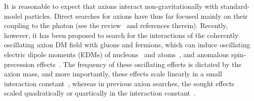 It is reasonable to expect that axions interact non-gravitationally with standard-model particles.
Direct searches for axions have thus far focused mainly on their coupling to the photon (see the review~\cite{Axion-Review2015} and references therein).
Recently, however, it has been proposed to search for the interactions of the coherently oscillating axion DM field with gluons and fermions, which can induce oscillating electric dipole moments (EDMs) of nucleons~\cite{Graham2011} and atoms~\cite{Stadnik2014A,Roberts2014A,Roberts2014B}, and anomalous spin-precession effects~\cite{Flambaum2013Patras,Stadnik2014A,Graham2013}.
The frequency of these oscillating effects is dictated by the axion mass, and more importantly, these effects scale linearly in a small interaction constant~\cite{Graham2011,Stadnik2014A,Roberts2014A,Roberts2014B,Flambaum2013Patras,Graham2013}, whereas in previous axion searches, the sought effects scaled quadratically or quartically in the interaction constant~\cite{Axion-Review2015}.

